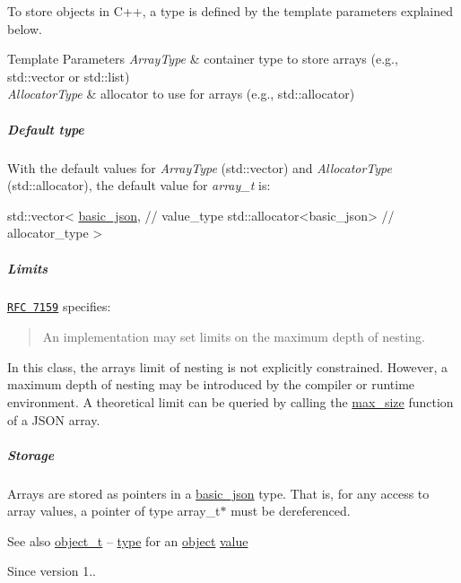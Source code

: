 To store objects in C++, a type is defined by the template parameters explained below.


\begin{DoxyTemplParams}{Template Parameters}
{\em Array\+Type} & container type to store arrays (e.\+g., {\ttfamily std\+::vector} or {\ttfamily std\+::list}) \\
\hline
{\em Allocator\+Type} & allocator to use for arrays (e.\+g., {\ttfamily std\+::allocator})\\
\hline
\end{DoxyTemplParams}
\subparagraph*{Default type}

With the default values for {\itshape Array\+Type} ({\ttfamily std\+::vector}) and {\itshape Allocator\+Type} ({\ttfamily std\+::allocator}), the default value for {\itshape array\+\_\+t} is\+:


\begin{DoxyCode}
std::vector<
  \mbox{\hyperlink{classnlohmann_1_1basic__json_aed115142bd0c6c66c864700e0467df55}{basic\_json}}, \textcolor{comment}{// value\_type}
  std::allocator<basic\_json> \textcolor{comment}{// allocator\_type}
>
\end{DoxyCode}


\subparagraph*{Limits}

\href{http://rfc7159.net/rfc7159}{\tt R\+FC 7159} specifies\+: \begin{quote}
An implementation may set limits on the maximum depth of nesting. \end{quote}


In this class, the array\textquotesingle{}s limit of nesting is not explicitly constrained. However, a maximum depth of nesting may be introduced by the compiler or runtime environment. A theoretical limit can be queried by calling the \mbox{\hyperlink{classnlohmann_1_1basic__json_a2f47d3c6a441c57dd2be00449fbb88e1}{max\+\_\+size}} function of a J\+S\+ON array.

\subparagraph*{Storage}

Arrays are stored as pointers in a \mbox{\hyperlink{classnlohmann_1_1basic__json}{basic\+\_\+json}} type. That is, for any access to array values, a pointer of type {\ttfamily array\+\_\+t$\ast$} must be dereferenced.

\begin{DoxySeeAlso}{See also}
\mbox{\hyperlink{classnlohmann_1_1basic__json_aa1eb13d5aa86f80cbee6c58e90fbaf49}{object\+\_\+t}} -- \mbox{\hyperlink{classnlohmann_1_1basic__json_a2b2d781d7f2a4ee41bc0016e931cadf7}{type}} for an \mbox{\hyperlink{classnlohmann_1_1basic__json_aa13f7c0615867542ce80337cbcf13ada}{object}} \mbox{\hyperlink{classnlohmann_1_1basic__json_adcf8ca5079f5db993820bf50036bf45d}{value}}
\end{DoxySeeAlso}
\begin{DoxySince}{Since}
version 1.. 
\end{DoxySince}
\mbox{\label{classnlohmann_1_1basic__json_a4c919102a9b4fe0d588af64801436082}} 
